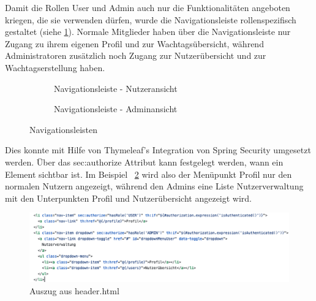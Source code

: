 \documentclass[fontsize=12pt,openright,oneside,paper=a4,BCOR=1cm]{scrbook}
\begin{document}
Damit die Rollen \glqq User\grqq{} und \glqq Admin\grqq{} auch nur die Funktionalit\"aten angeboten kriegen, die sie verwenden d\"urfen, wurde die Navigationsleiste rollenspezifisch gestaltet (siehe \ref{fig:anwendungNavbars}). Normale Mitglieder haben \"uber die Navigationsleiste nur Zugang zu ihrem eigenen Profil und zur Wachtags\"ubersicht, w\"ahrend Administratoren zus\"atzlich noch Zugang zur Nutzer\"ubersicht und zur Wachtagserstellung haben.

\begin{figure}[H]
  \centering
  \begin{subfigure}[b]{0.5\linewidth}
    \caption{Navigationsleiste - Nutzeransicht}
  \end{subfigure}
  \begin{subfigure}[b]{0.5\linewidth}
    \caption{Navigationsleiste - Adminansicht}
  \end{subfigure}
  \caption{Navigationsleisten}
  \label{fig:anwendungNavbars}
\end{figure}

Dies konnte mit Hilfe von Thymeleaf's Integration von Spring Security umgesetzt werden. \"Uber das \glqq sec:authorize\grqq{} Attribut kann festgelegt werden, wann ein Element sichtbar ist. Im Beispiel ~\ref{fig:code-navbar} wird also der Men\"upunkt \glqq Profil\grqq{} nur den normalen Nutzern angezeigt, w\"ahrend den Admins eine Liste \glqq Nutzerverwaltung\grqq{} mit den Unterpunkten \glqq Profil\grqq{} und \glqq Nutzer\"ubersicht\grqq{} angezeigt wird.

\begin{figure}[H]
  \centering
    \includegraphics[width=0.7\linewidth]{Anlagen/Code/navbar.png}
    \caption{Auszug aus header.html}
  \label{fig:code-navbar}
\end{figure}
\end{document}
